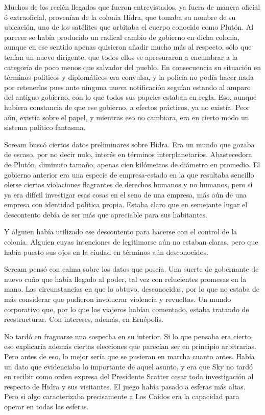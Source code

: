 Muchos de los recién llegados que fueron entrevistados, ya fuera de manera oficial ó extraoficial, provenían de la colonia Hidra, que tomaba su nombre de su ubicación, uno de los satélites que orbitaba el cuerpo conocido como Plutón. Al parecer se había producido un radical cambio de gobierno en dicha colonia, aunque en ese sentido apenas quisieron añadir mucho más al respecto, sólo que tenían un nuevo dirigente, que todos ellos se apresuraron a encumbrar a la categoría de poco menos que salvador del pueblo. En consecuencia su situación en términos políticos y diplomáticos era convulsa, y la policía no podía hacer nada por retenerlos pues ante ninguna nueva notificación seguían estando al amparo del antiguo gobierno, con lo que todos sus papeles estaban en regla. Eso, aunque hubiera constancia de que ese gobierno, a efectos prácticos, ya no existía. Peor aún, existía sobre el papel, y mientras eso no cambiara, era en cierto modo un sistema político fantasma.

Scream buscó ciertos datos preliminares sobre Hidra. Era un mundo que gozaba de escaso, por no decir nulo, interés en términos interplanetarios. Abastecedora de Plutón, diminuto tamaño, apenas cien kilómetros de diámetro en promedio. El gobierno anterior era una especie de empresa-estado en la que resultaba sencillo olerse ciertas violaciones flagrantes de derechos humanos y no humanos, pero si ya era difícil investigar esas cosas en el seno de una empresa, más aún de una empresa con identidad política propia. Estaba claro que en semejante lugar el descontento debía de ser más que apreciable para sus habitantes.

Y alguien había utilizado ese descontento para hacerse con el control de la colonia. Alguien cuyas intenciones de legitimarse aún no estaban claras, pero que había puesto sus ojos en la ciudad en términos aún desconocidos.

Scream pensó con calma sobre los datos que poseía. Una suerte de gobernante de nuevo cuño que había llegado al poder, tal vez con relucientes promesas en la mano. Las circunstancias en que lo obtuvo, desconocidas, por lo que no estaba de más considerar que pudieron involucrar violencia y revueltas. Un mundo corporativo que, por lo que los viajeros habían comentado, estaba tratando de reestructurar. Con intereses, además, en Ernépolis.

No tardó en fraguarse una sospecha en su interior. Si lo que pensaba era cierto, eso explicaría además ciertas elecciones que parecían ser en principio arbitrarias. Pero antes de eso, lo mejor sería que se pusieran en marcha cuanto antes. Había un dato que evidenciaba lo importante de aquel asunto, y era que Sky no tardó en recibir como orden expresa del Presidente Scatter cesar toda investigación al respecto de Hidra y sus visitantes. El juego había pasado a esferas más altas. Pero si algo caracterizaba precisamente a Los Caídos era la capacidad para operar en todas las esferas.

